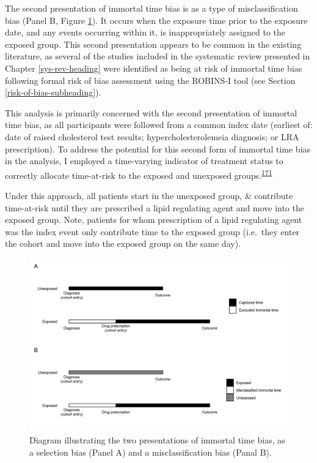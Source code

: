 \documentclass[a4paper, twoside]{templates/ociamthesis}
\begin{document}
The second presentation of immortal time bias is as a type of misclassification bias (Panel B, Figure \ref{fig:immortalTimeBias}). It occurs when the exposure time prior to the exposure date, and any events occurring within it, is inappropriately assigned to the exposed group. This second presentation appears to be common in the existing literature, as several of the studies included in the systematic review presented in Chapter \ref{sys-rev-heading} were identified as being at risk of immortal time bias following formal risk of bias assessment using the ROBINS-I tool (see Section \ref{risk-of-bias-subheading}).

This analysis is primarily concerned with the second presentation of immortal time bias, as all participants were followed from a common index date (earliest of: date of raised cholesterol test results; hypercholesterolemeia diagnosis; or LRA prescription). To address the potential for this second form of immortal time bias in the analysis, I employed a time-varying indicator of treatment status to correctly allocate time-at-risk to the exposed and unexposed groups.\textsuperscript{\protect\hyperlink{ref-levesque2010}{171}}

Under this approach, all patients start in the unexposed group, \& contribute time-at-risk until they are prescribed a lipid regulating agent and move into the exposed group. Note, patients for whom prescription of a lipid regulating agent was the index event only contribute time to the exposed group (i.e.~they enter the cohort and move into the exposed group on the same day).





\begin{figure}[H]
\includegraphics[width=1\linewidth]{figures/cprd-analysis/immortal_time} \caption[shortcap]{Diagram illustrating the two presentations of immortal time bias, as a selection bias (Panel A) and a misclassification bias (Panal B).}\label{fig:immortalTimeBias}
\end{figure}
\end{document}
